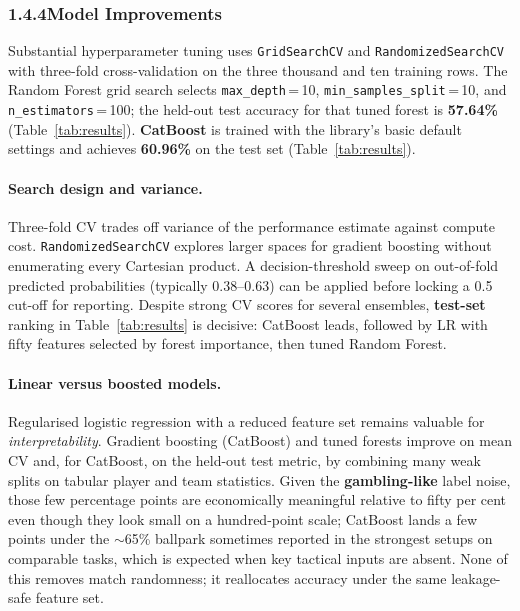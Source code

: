 \documentclass[12pt,a4paper]{article}
\newcommand{\GridSearchCVname}{\texttt{Grid\allowbreak Search\allowbreak CV}}
\newcommand{\RandomizedSearchCVname}{\texttt{Randomized\allowbreak Search\allowbreak CV}}
\begin{document}
\subsubsection{1.4.4\quad Model Improvements}

Substantial hyperparameter tuning uses \GridSearchCVname{} and \RandomizedSearchCVname{} with three-fold cross-validation on the three thousand and ten training rows. The Random Forest grid search selects \texttt{max\_depth}\,{=}\,10, \texttt{min\_samples\_split}\,{=}\,10, and \texttt{n\_estimators}\,{=}\,100; the held-out test accuracy for that tuned forest is \textbf{57.64\%} (Table~\ref{tab:results}). \textbf{CatBoost} is trained with the library's basic default settings and achieves \textbf{60.96\%} on the test set (Table~\ref{tab:results}).

\paragraph{Search design and variance.}
Three-fold CV trades off variance of the performance estimate against compute cost. \RandomizedSearchCVname{} explores larger spaces for gradient boosting without enumerating every Cartesian product. A decision-threshold sweep on out-of-fold predicted probabilities (typically 0.38--0.63) can be applied before locking a 0.5 cut-off for reporting. Despite strong CV scores for several ensembles, \textbf{test-set} ranking in Table~\ref{tab:results} is decisive: CatBoost leads, followed by LR with fifty features selected by forest importance, then tuned Random Forest.

\paragraph{Linear versus boosted models.}
Regularised logistic regression with a reduced feature set remains valuable for \textit{interpretability}. Gradient boosting (CatBoost) and tuned forests improve on mean CV and, for CatBoost, on the held-out test metric, by combining many weak splits on tabular player and team statistics. Given the \textbf{gambling-like} label noise, those few percentage points are economically meaningful relative to fifty per cent even though they look small on a hundred-point scale; CatBoost lands a few points under the $\sim$65\% ballpark sometimes reported in the strongest setups on comparable tasks, which is expected when key tactical inputs are absent. None of this removes match randomness; it reallocates accuracy under the same leakage-safe feature set.
\end{document}
